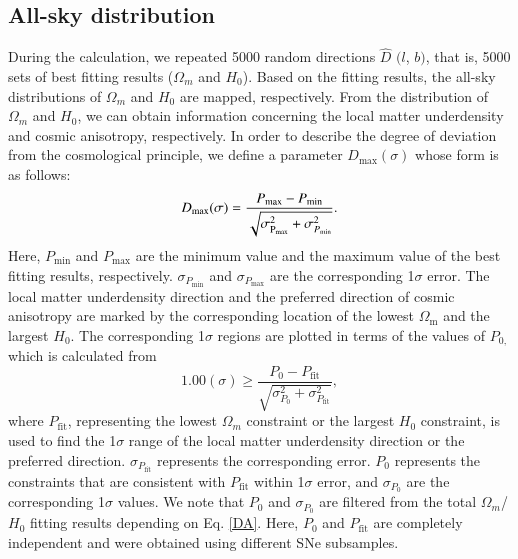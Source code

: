 \documentclass{aa}
\begin{document}
\subsection{All-sky distribution}
During the calculation, we repeated 5000 random directions $\hat{D}$ $(l$, $b)$, that is, 5000 sets of best fitting results ($\Omega_{m}$ and $H_{0}$). Based on the fitting results, the all-sky distributions of $\Omega_{m}$ and $H_{0}$ are mapped, respectively. From the distribution of $\Omega_{m}$ and $H_{0}$, we can obtain information concerning the local matter underdensity and cosmic anisotropy, respectively. In order to describe the degree of deviation from the cosmological principle, we define a parameter $D_\mathrm{max}(\sigma)$ whose form is as follows:
\begin{equation}
        D_\mathrm{max}(\sigma) = \frac{P_\mathrm{max} - P_\mathrm{min}}{\sqrt{\sigma_{\rm P_\mathrm{max}}^{2}+\sigma_{P_\mathrm{min}}^{2}}}.
        \label{CS}
\end{equation}
Here, $P_\mathrm{min}$ and $P_\mathrm{max}$ are the minimum value and the maximum value of the best fitting results, respectively. $\sigma_{P_\mathrm{min}}$ and $\sigma_{P_\mathrm{max}}$ are the corresponding 1$\sigma$ error. The local matter underdensity direction and the preferred direction of cosmic anisotropy are marked by the corresponding location of the lowest $\Omega_\mathrm{m}$ and the largest $H_{0}$. The corresponding 1$\sigma$ regions are plotted in terms of the values of $P_{0,}$ which is calculated from
\begin{equation}
        1.00(\sigma) \geqslant \frac{P_{0} - P_\mathrm{fit}}{\sqrt{\sigma_{ P_{0}}^{2}+\sigma_{ P_\mathrm{fit}}^{2}}},
        \label{DA}
\end{equation}
where $P_\mathrm{fit}$, representing the lowest $\Omega_{m}$ constraint or the largest $H_{0}$ constraint, is used to find the 1$\sigma$ range of the local matter underdensity direction or the preferred direction. $\sigma_{P_\mathrm{fit}}$ represents the corresponding error. $P_{0}$ represents the constraints that are consistent with $P_\mathrm{fit}$ within 1$\sigma$ error, and $\sigma_{P_{0}}$ are the corresponding 1$\sigma$ values. We note that $P_{0}$ and $\sigma_{P_{0}}$ are filtered from the total $\Omega_{m}$/$H_{0}$ fitting results depending on Eq. \ref{DA}. Here, $P_{0}$ and $P_\mathrm{fit}$ are completely independent and were obtained using different SNe subsamples.
 
 
\end{document}
